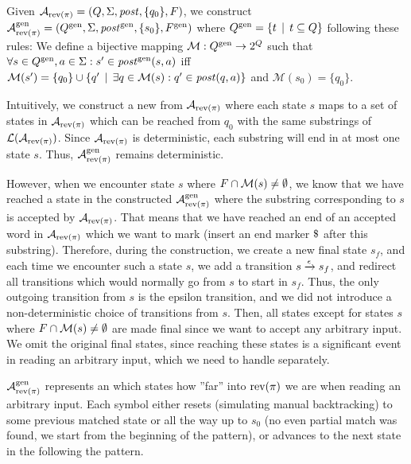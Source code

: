 Given $\mathcal{A}_{\text{rev(}\pi\text{)}} = (Q, \Sigma, \mathit{post}, \{ q_0 \}, F)$, we construct $\mathcal{A}^{\text{gen}}_{\text{rev(}\pi\text{)}} = (Q^{\text{gen}}, \Sigma, \mathit{post}^{\text{gen}}, \{ s_0 \}, F^{\text{gen}})$ where $Q^{\text{gen}} = \{ t \,\mid\, t \subseteq Q \}$ following these rules:\newline
We define a bijective mapping $\mathcal{M}: Q^{\text{gen}} \rightarrow 2^{Q }$ such that $\forall s \in Q^{\text{gen}}, a \in \Sigma: s' \in \mathit{post}^{\text{gen}}(s, a)$
iff $\mathcal{M}(s') = \{ q_0 \} \cup \{ q' \,\mid\, \exists q \in \mathcal{M}(s): q' \in \mathit{post}(q, a) \}$
and $\mathcal{M}(s_0) = \{ q_0 \}$.

Intuitively, we construct a new \dfa from $\mathcal{A}_{\text{rev(}\pi\text{)}}$ where each state $s$ maps to a set of states in $\mathcal{A}_{\text{rev(}\pi\text{)}}$ which can be reached from $q_0$ with the same substrings of $\mathcal{L}(\mathcal{A}_{\text{rev(}\pi\text{)}})$.
Since $\mathcal{A}_{\text{rev(}\pi\text{)}}$ is deterministic, each substring will end in at most one state $s$.
Thus, $\mathcal{A}^{\text{gen}}_{\text{rev(}\pi\text{)}}$ remains deterministic.

However, when we encounter state $s$ where $F \cap \mathcal{M}(s) \neq \emptyset$, we know that we have reached a state in the constructed $\mathcal{A}^{\text{gen}}_{\text{rev(}\pi\text{)}}$ where the substring corresponding to $s$ is accepted by $\mathcal{A}_{\text{rev(}\pi\text{)}}$.
That means that we have reached an end of an accepted word in $\mathcal{A}_{\text{rev(}\pi\text{)}}$ which we want to mark (insert an end marker $\marker$ after this substring).
Therefore, during the construction, we create a new final state $s_f$, and each time we encounter such a state $s$, we add a transition ${s} \xrightarrow{{\epsilon}} {s_f}$, and redirect all transitions which would normally go from $s$ to start in $s_f$.
Thus, the only outgoing transition from $s$ is the epsilon transition, and we did not introduce a non-deterministic choice of transitions from $s$.
Then, all states except for states $s$ where $F \cap \mathcal{M}(s) \neq \emptyset$ are made final since we want to accept any arbitrary input.
We omit the original final states, since reaching these states is a significant event in reading an arbitrary input, which we need to handle separately.

$\mathcal{A}^{\text{gen}}_{\text{rev(}\pi\text{)}}$ represents an \dfa which states how ''far'' into $\text{rev(}\pi\text{)}$ we are when reading an arbitrary input.
Each symbol either resets \dfa (simulating manual backtracking) to some previous matched state or all the way up to $s_0$ (no even partial match was found, we start from the beginning of the pattern), or advances to the next state in the \dfa following the pattern.

